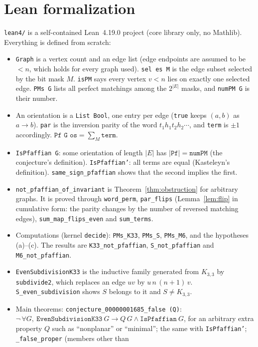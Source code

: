 \documentclass[11pt]{article}
\theoremstyle{definition}
\theoremstyle{remark}
\begin{document}
\section{Lean formalization}
\texttt{lean4/} is a self-contained Lean~4.19.0 project (core library only, no
Mathlib). Everything is defined from scratch:
\begin{itemize}
\item \texttt{Graph} is a vertex count and an edge list (edge endpoints are assumed to
be $<n$, which holds for every graph used). \texttt{sel es M} is the edge
subset selected by the bit mask $M$. \texttt{isPM} says every vertex $v<n$ lies on
exactly one selected edge. \texttt{PMs G} lists all perfect matchings among the
$2^{|E|}$ masks, and \texttt{numPM G} is their number.
\item An orientation is a \texttt{List Bool}, one entry per edge (\texttt{true} keeps
$(a,b)$ as $a\to b$). \texttt{par} is the inversion parity of the word
$t_1h_1t_2h_2\cdots$, and \texttt{term} is $\pm1$ accordingly.
$\texttt{Pf G os}=\sum_{M}\texttt{term}$.
\item \texttt{IsPfaffian G}: some orientation of length $|E|$ has
$|\texttt{Pf}|=\texttt{numPM}$ (the conjecture's definition). \texttt{IsPfaffian'}:
all terms are equal (Kasteleyn's definition). \texttt{same\_sign\_pfaffian} shows
that the second implies the first.
\item \texttt{not\_pfaffian\_of\_invariant} is Theorem~\ref{thm:obstruction} for
arbitrary graphs. It is proved through \texttt{word\_perm}, \texttt{par\_flips}
(Lemma~\ref{lem:flip} in cumulative form: the parity changes by the number of
reversed matching edges), \texttt{sum\_map\_flips\_even} and \texttt{sum\_terms}.
\item Computations (kernel \texttt{decide}): \texttt{PMs\_K33}, \texttt{PMs\_S},
\texttt{PMs\_M6}, and the hypotheses (a)--(c). The results are
\texttt{K33\_not\_pfaffian}, \texttt{S\_not\_pfaffian} and \texttt{M6\_not\_pfaffian}.
\item \texttt{EvenSubdivisionK33} is the inductive family generated from $K_{3,3}$ by
\texttt{subdivide2}, which replaces an edge $uv$ by $u\,n\,(n{+}1)\,v$.
\texttt{S\_even\_subdivision} shows $S$ belongs to it and $S\ne K_{3,3}$.
\item Main theorems:
\texttt{conjecture\_00000001685\_false (Q)}:
$\neg\,\forall G,\ \texttt{EvenSubdivisionK33}\ G\to Q\,G\wedge\texttt{IsPfaffian}\ G$, for an
arbitrary extra property $Q$ such as ``nonplanar'' or ``minimal'';
the same with \texttt{IsPfaffian'}; \texttt{\_false\_proper} (members other than

\end{itemize}
\end{document}
